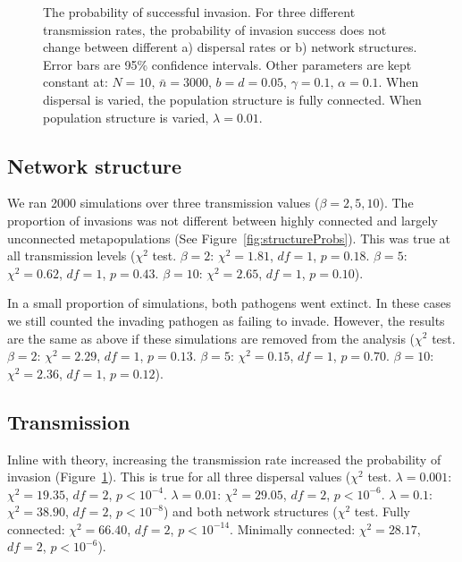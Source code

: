 \begin{figure}[b]
\caption[Invasion probability]{
The probability of successful invasion. 
For three different transmission rates, the probability of invasion success does not change between different a) dispersal rates or b) network structures. 
Error bars are 95\% confidence intervals. 
Other parameters are kept constant at: $N = 10,\, \bar{n} = 3000,\, b = d = 0.05,\, \gamma = 0.1,\, \alpha = 0.1$. 
When dispersal is varied, the population structure is fully connected. When population structure is varied, $\lambda = 0.01$.
}
\label{f:props}
\end{figure}


\subsection{Network structure}


We ran 2000 simulations over three transmission values ($\beta = 2, 5, 10$).
The proportion of invasions was not different between highly connected and largely unconnected metapopulations (See Figure~\ref{fig:structureProbs}). 
This was true at all transmission levels ($\chi^2$ test. $\beta = 2$: $\chi^2 = 1.81$, $df = 1$, $p =  0.18$. $\beta = 5$: $\chi^2 =  0.62$, $df = 1$, $p = 0.43$. $\beta = 10$: $\chi^2 = 2.65$, $df = 1$, $p =0.10$).

In a small proportion of simulations, both pathogens went extinct.
In these cases we still counted the invading pathogen as failing to invade.
However, the results are the same as above if these simulations are removed from the analysis ($\chi^2$ test. $\beta = 2$: $\chi^2 = 2.29$, $df = 1$, $p = 0.13$. $\beta = 5$: $\chi^2 = 0.15$, $df = 1$, $p = 0.70$. $\beta = 10$: $\chi^2 = 2.36$, $df = 1$, $p = 0.12$).

 
\subsection{Transmission}

Inline with theory, increasing the transmission rate increased the probability of invasion (Figure~\ref{f:props}).
This is true for all three dispersal values ($\chi^2$ test. $\lambda = 0.001$: $\chi^2 = 19.35$, $df = 2$, $p < 10^{-4}$. $\lambda = 0.01$: $\chi^2 = 29.05$, $df = 2$, $p < 10^{-6}$. $\lambda = 0.1$: $\chi^2 = 38.90$, $df = 2$, $p < 10^{-8}$) and both network structures ($\chi^2$ test. Fully connected: $\chi^2 = 66.40$, $df = 2$, $p < 10^{-14}$. Minimally connected: $\chi^2 = 28.17$, $df = 2$, $p < 10^{-6}$).

